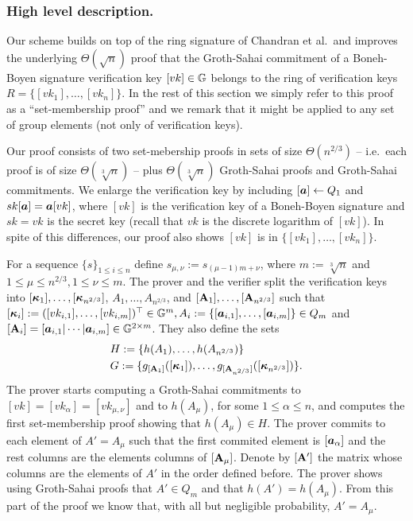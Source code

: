 \subsubsection{High level description.}
Our scheme builds on top of the ring signature of Chandran et al.~and improves the underlying $\Theta(\sqrt{n})$ proof that the Groth-Sahai commitment of a Boneh-Boyen signature verification key $[vk]\in\mathbb{G}$ belongs to the ring of verification keys $R=\{[vk_1],\ldots,[vk_n]\}$. In the rest of this section we simply refer to this proof as a ``set-membership proof'' and we remark that it might be applied to any set of group elements (not only of verification keys).

Our proof consists of two set-mebership proofs in sets of size $\Theta(n^{2/3})$ -- i.e.~each proof is of size $\Theta(\sqrt[3]{n})$ --  plus $\Theta(\sqrt[3]{n})$ Groth-Sahai proofs and Groth-Sahai commitments.
We enlarge the verification key by including $[{\boldsymbol{a}}]\gets Q_1$ and $sk[{\boldsymbol{a}}]={\boldsymbol{a}}[vk]$, where $[vk]$ is the verification key of a Boneh-Boyen signature and $sk=vk$ is the secret key (recall that $vk$ is the discrete logarithm of $[vk]$). In spite of this differences, our proof also shows $[vk]$ is in $\{[vk_1],\ldots,[vk_n]\}$.

For a sequence $\{s\}_{1\leq i \leq n}$ define $s_{\mu,\nu}:=s_{(\mu-1)m+\nu}$, where $m:=\sqrt[3]{n}$ and $1\leq\mu\leq n^{2/3},1\leq \nu\leq m$.  The prover and the verifier split the verification keys into $[{\boldsymbol{\kappa}}_1],\ldots, [{\boldsymbol{\kappa}}_{n^{2/3}}]$, $A_1,\ldots, A_{n^{2/3}}$, and $[\mathbf{{A}}_1],\ldots, [\mathbf{{A}}_{n^{2/3}}]$ such that $[{\boldsymbol{\kappa}}_i]:= ([vk_{i,1}],\ldots,[vk_{i,m}])^\top\in\mathbb{G}^m, A_i:=\{[{\boldsymbol{a}}_{i,1}],\ldots,[{\boldsymbol{a}}_{i,m}]\}\in Q_m$ and $[\mathbf{{A}}_i]=[{\boldsymbol{a}}_{i,1}|\cdots|{\boldsymbol{a}}_{i,m}]\in\mathbb{G}^{2\times m}$. They also define the sets
\begin{align*}
&H:=\{h(A_1),\ldots,\allowbreak h(A_{n^{2/3}})\}\\
&G:=\{g_{[\mathbf{{A}}_1]}([{\boldsymbol{\kappa}}_1]),\allowbreak\ldots,g_{[\mathbf{{A}}_{n^{2/3}}]}([{\boldsymbol{\kappa}}_{n^{2/3}}])\}.
\end{align*}
The prover starts computing a Groth-Sahai commitments to $[vk]=[vk_\alpha]=[vk_{\mu,\nu}]$ and to $h(A_\mu)$, for some $1\leq \alpha \leq n$, and computes the first set-membership proof showing that $h(A_\mu)\in H$.
The prover commits to each element of $A'=A_\mu$ such that the first commited element is $[{\boldsymbol{a}}_\alpha]$ and the rest columns are the elements columns of $[\mathbf{{A}}_\mu]$. Denote by $[\mathbf{{A}}']$ the matrix whose columns are the elements of $A'$ in the order defined before.  The prover shows using Groth-Sahai proofs that $A'\in Q_m$ and that $h(A')=h(A_\mu)$. From this part of the proof we know that, with all but negligible probability, $A'=A_\mu$.

